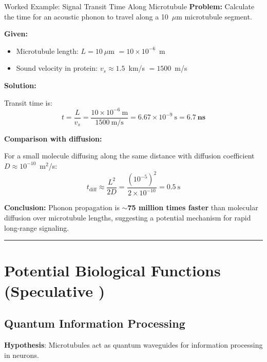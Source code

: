 \begin{calloutbox}{Worked Example: Signal Transit Time Along Microtubule}
\textbf{Problem:} Calculate the time for an acoustic phonon to travel along a 10~$\mu$m microtubule segment.

\textbf{Given:}
\begin{itemize}
\item Microtubule length: $L = 10~\mu$m $= 10 \times 10^{-6}$~m
\item Sound velocity in protein: $v_s \approx 1.5$~km/s $= 1500$~m/s
\end{itemize}

\textbf{Solution:}

Transit time is:
\begin{equation}
t = \frac{L}{v_s} = \frac{10 \times 10^{-6}~\text{m}}{1500~\text{m/s}} = 6.67 \times 10^{-9}~\text{s} = \mathbf{6.7~\text{ns}}
\end{equation}

\textbf{Comparison with diffusion:}

For a small molecule diffusing along the same distance with diffusion coefficient $D \approx 10^{-10}$~m$^2$/s:
\begin{equation}
t_{\text{diff}} \approx \frac{L^2}{2D} = \frac{(10^{-5})^2}{2 \times 10^{-10}} = 0.5~\text{s}
\end{equation}

\textbf{Conclusion:} Phonon propagation is \textbf{$\sim$75 million times faster} than molecular diffusion over microtubule lengths, suggesting a potential mechanism for rapid long-range signaling.
\end{calloutbox}

\begin{center}\rule{0.5\linewidth}{0.5pt}\end{center}

\section{Potential Biological Functions (Speculative
)}\label{potential-biological-functions-speculative}

\subsection{Quantum Information
Processing}\label{quantum-information-processing}

\textbf{Hypothesis}: Microtubules act as quantum waveguides for
information processing in neurons.

